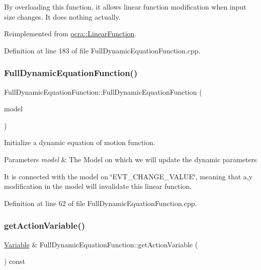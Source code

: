 By overloading this function, it allows linear function modification when input size changes. It does nothing actually. 

Reimplemented from \hyperlink{classocra_1_1LinearFunction_ac6bdf62ad6634397778d5f4223ed6d82}{ocra\+::\+Linear\+Function}.



Definition at line 183 of file Full\+Dynamic\+Equation\+Function.\+cpp.

\hypertarget{group__constraint_ga778bffa6d85a494b3ee0c499400573a6}{}\label{group__constraint_ga778bffa6d85a494b3ee0c499400573a6} 
\subsubsection{\texorpdfstring{Full\+Dynamic\+Equation\+Function()}{FullDynamicEquationFunction()}}
{\footnotesize\ttfamily Full\+Dynamic\+Equation\+Function\+::\+Full\+Dynamic\+Equation\+Function (\begin{DoxyParamCaption}\item[{const Model \&}]{model }\end{DoxyParamCaption})}

Initialize a dynamic equation of motion function.


\begin{DoxyParams}{Parameters}
{\em model} & The Model on which we will update the dynamic parameters\\
\hline
\end{DoxyParams}
It is connected with the model on \char`\"{}\+E\+V\+T\+\_\+\+C\+H\+A\+N\+G\+E\+\_\+\+V\+A\+L\+U\+E\char`\"{}, meaning that a,y modification in the model will invalidate this linear function. 

Definition at line 62 of file Full\+Dynamic\+Equation\+Function.\+cpp.

\hypertarget{group__constraint_gaa3c3057ca6a00bf88c372d0c467bed67}{}\label{group__constraint_gaa3c3057ca6a00bf88c372d0c467bed67} 
\subsubsection{\texorpdfstring{get\+Action\+Variable()}{getActionVariable()}}
{\footnotesize\ttfamily \hyperlink{classocra_1_1Variable}{Variable} \& Full\+Dynamic\+Equation\+Function\+::get\+Action\+Variable (\begin{DoxyParamCaption}{ }\end{DoxyParamCaption}) const}




